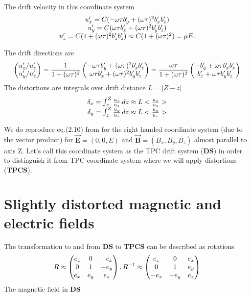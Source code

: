 \documentclass[12pt]{article} %
\begin{document}
The drift velocity in this coordinate system
\begin{equation*} 
\begin{matrix} 
u'_{x} = C (  -  \omega \tau b'_{y} + (\omega \tau )^2  b'_{x} b'_{z} )\cr
u'_{y} = C (     \omega \tau b'_{x} + (\omega \tau )^2  b'_{y} b'_{z} )\cr
u'_{z} = C (1                       + (\omega \tau )^2  b'_{z} b'_{z} ) \approx 
         C (1                       + (\omega \tau )^2 ) = \mu E .
\end{matrix}
\end{equation*}

The drift directions are 
\begin{equation}\label{direq}
\begin{pmatrix}
u'_{x}/u'_{z} \cr
u'_{y}/u'_{z}
\end{pmatrix}
=
\frac{1}{1 + (\omega \tau )^2  }
\begin{pmatrix}
-\omega \tau b'_{y} + (\omega \tau )^2  b'_{x} b'_{z} \cr
 \omega \tau b'_{x} + (\omega \tau )^2  b'_{y} b'_{z}    
\end{pmatrix}
=
\frac{\omega \tau}{1 + (\omega \tau )^2  }
\begin{pmatrix}
-  b'_{y} + \omega \tau  b'_{x} b'_{z} \cr
   b'_{x} + \omega \tau  b'_{y} b'_{z}    
\end{pmatrix}
\end{equation}
The distortions are integrals over drift distance $L = \left| Z - z \right|$
\begin{equation*} 
\begin{matrix}
\delta_{x} = \int_{z}^{Z} \frac{u_{x}}{u_{z}}  \,dz  \approx L < \frac{u_{x}}{u_{z}} > \cr
\delta_{y} = \int_{z}^{Z} \frac{u_{y}}{u_{z}}  \,dz  \approx L < \frac{u_{y}}{u_{z}} >
\end{matrix}
\end{equation*}


We do reproduce eq.(2.10) from \cite{Blum} for the right handed coordinate system (due to the vector product) for $ \overrightarrow{\mathbf{E}} = (0, 0, E)$ and 
$ \overrightarrow{\mathbf{B}} = (B_{x}, B_{y}, B_{z})$ almost parallel to axis Z. Let's call this coordinate system as the TPC drift system ({\bf DS}) 
in order to distinguish it from TPC coordinate system where we will apply distortions ({\bf TPCS}). %

\section{Slightly distorted  magnetic and  electric fields}
The transformation to and from  {\bf DS} to {\bf TPCS} can be described as rotations 
\begin{equation*} 
R \approx
\begin{pmatrix} 
    e_{z} & 0    & -e_{x} \cr
    0     &    1 & -e_{y} \cr
    e_{x} & e_{y}&  e_{z}
\end{pmatrix}
, R^{-1} \approx  
\begin{pmatrix} 
     e_{z} &     0 & e_{x} \cr
     0     &     1 & e_{y} \cr
    -e_{x} & -e_{y}& e_{z}
\end{pmatrix}
\end{equation*}
The magnetic field in {\bf DS}
\end{document}
